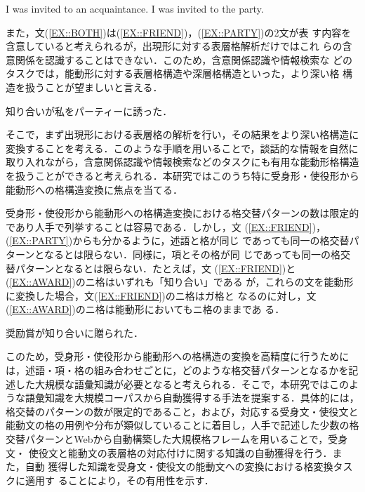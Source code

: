 \documentclass[japanese]{jnlp_1.4}
\begin{document}
\begin{exe}
  I was invited to an acquaintance. \label{EXE::FRIEND}
  I was invited to the party. \label{EXE::PARTY}
\end{exe}

 また，文(\ref{EX::BOTH})は(\ref{EX::FRIEND})，(\ref{EX::PARTY})の2文が表
 す内容を含意していると考えられるが，出現形に対する表層格解析だけではこれ
 らの含意関係を認識することはできない．このため，含意関係認識や情報検索な
 どのタスクでは，能動形に対する表層格構造や深層格構造といった，より深い格
 構造を扱うことが望ましいと言える．

\begin{exe}
 \ex 知り合いが私をパーティーに誘った．\label{EX::BOTH}
\end{exe}

 そこで，まず出現形における表層格の解析を行い，その結果をより深い格構造に
 変換することを考える．このような手順を用いることで，談話的な情報を自然に
 取り入れながら，含意関係認識や情報検索などのタスクにも有用な能動形格構造
 を扱うことができると考えられる．本研究ではこのうち特に受身形・使役形から
 能動形への格構造変換に焦点を当てる．

 受身形・使役形から能動形への格構造変換における格交替パターンの数は限定的
 であり人手で列挙することは容易である．しかし，文
 (\ref{EX::FRIEND})，(\ref{EX::PARTY})からも分かるように，述語と格が同じ
 であっても同一の格交替パターンとなるとは限らない．同様に，項とその格が同
 じであっても同一の格交替パターンとなるとは限らない．たとえば，文
 (\ref{EX::FRIEND})と(\ref{EX::AWARD})のニ格はいずれも「知り合い」である
 が，これらの文を能動形に変換した場合，文(\ref{EX::FRIEND})のニ格はガ格と
 なるのに対し，文(\ref{EX::AWARD})のニ格は能動形においてもニ格のままであ
 る．

\begin{exe}
 \ex 奨励賞が知り合いに贈られた．\label{EX::AWARD}
\end{exe}

 このため，受身形・使役形から能動形への格構造の変換を高精度に行うために
 は，述語・項・格の組み合わせごとに，どのような格交替パターンとなるかを記
 述した大規模な語彙知識が必要となると考えられる．そこで，本研究ではこのよ
 うな語彙知識を大規模コーパスから自動獲得する手法を提案する．具体的には，
 格交替のパターンの数が限定的であること，および，対応する受身文・使役文と
 能動文の格の用例や分布が類似していることに着目し，人手で記述した少数の格
 交替パターンとWebから自動構築した大規模格フレームを用いることで，受身文・
 使役文と能動文の表層格の対応付けに関する知識の自動獲得を行う．また，自動
 獲得した知識を受身文・使役文の能動文への変換における格変換タスクに適用す
 ることにより，その有用性を示す．
\end{document}
